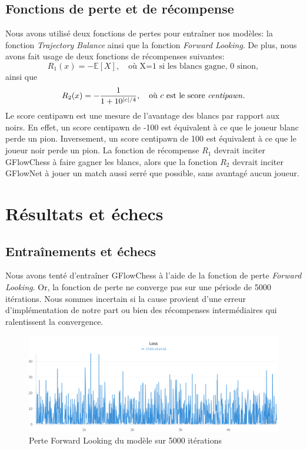\documentclass[11pt]{article}
\begin{document}
\subsection*{Fonctions de perte et de récompense}
Nous avons utilisé deux fonctions de pertes pour entraîner nos
modèles: la fonction \textit{Trajectory Balance} ainsi que la fonction
\textit{Forward Looking}. De plus, nous avons fait usage de deux
fonctions de récompenses suivantes:
\begin{equation*}
  R_{1}(x) = - \mathbb{E}[X], \quad \text{où X=1 si les blancs gagne, 0 sinon},
\end{equation*} ainsi que
\begin{equation*}
  R_{2}(x) = - \frac{1}{1+10^{|c|/4}}, \quad \text{où $c$ est le score \textit{centipawn}}.
\end{equation*}Le score centipawn est une mesure de l'avantage des
blancs par rapport aux noirs. En effet, un score centipawn de -100 est
équivalent à ce que le joueur blanc perde un pion. Inversement, un
score centipawn de 100 est équivalent à ce que le joueur noir perde un
pion. La fonction de récompense $R_{1}$ devrait inciter GFlowChess à
faire gagner les blancs, alors que la fonction $R_{2}$ devrait inciter
GFlowNet à jouer un match aussi serré que possible, sans avantagé
aucun joueur.

\section*{Résultats et échecs}
\subsection*{Entraînements et échecs}
Nous avons tenté d'entraîner GFlowChess à l'aide de la fonction de
perte \textit{Forward Looking}. Or, la fonction de perte ne converge
pas sur une période de 5000 itérations.  Nous sommes incertain si la
cause provient d'une erreur d'implémentation de notre part ou bien des
récompenses intermédiaires qui ralentissent la convergence.
\begin{figure}[H]
  \centering \includegraphics[scale=0.15]{fwloss.png}
  \caption{Perte Forward Looking du modèle sur 5000 itérations}
	\label{fig:fwloss}
\end{figure}
\end{document}
